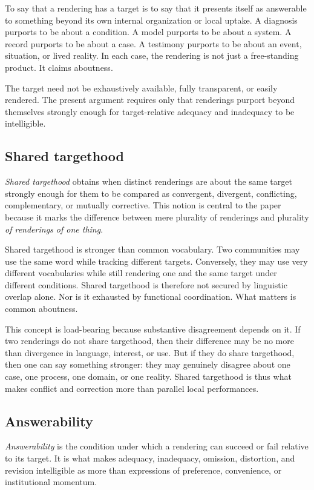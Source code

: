 \documentclass[11pt]{article}
\renewcommand{\emph}[1]{\textit{#1}}
\begin{document}
To say that a rendering has a target is to say that it presents itself as answerable to something beyond its own internal organization or local uptake. A diagnosis purports to be about a condition. A model purports to be about a system. A record purports to be about a case. A testimony purports to be about an event, situation, or lived reality. In each case, the rendering is not just a free-standing product. It claims aboutness.

The target need not be exhaustively available, fully transparent, or easily rendered. The present argument requires only that renderings purport beyond themselves strongly enough for target-relative adequacy and inadequacy to be intelligible.

\subsection{Shared targethood}

\emph{Shared targethood} obtains when distinct renderings are about the same target strongly enough for them to be compared as convergent, divergent, conflicting, complementary, or mutually corrective. This notion is central to the paper because it marks the difference between mere plurality of renderings and plurality \emph{of renderings of one thing}.

Shared targethood is stronger than common vocabulary. Two communities may use the same word while tracking different targets. Conversely, they may use very different vocabularies while still rendering one and the same target under different conditions. Shared targethood is therefore not secured by linguistic overlap alone. Nor is it exhausted by functional coordination. What matters is common aboutness.

This concept is load-bearing because substantive disagreement depends on it. If two renderings do not share targethood, then their difference may be no more than divergence in language, interest, or use. But if they do share targethood, then one can say something stronger: they may genuinely disagree about one case, one process, one domain, or one reality. Shared targethood is thus what makes conflict and correction more than parallel local performances.

\subsection{Answerability}

\emph{Answerability} is the condition under which a rendering can succeed or fail relative to its target. It is what makes adequacy, inadequacy, omission, distortion, and revision intelligible as more than expressions of preference, convenience, or institutional momentum.
\end{document}
